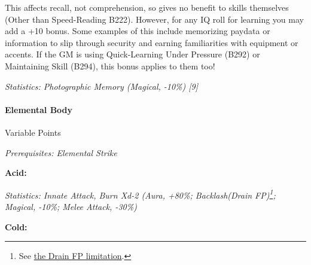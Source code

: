 \begin{multicols*}{3}
	This affects recall, not comprehension, so gives no benefit to skills themselves (Other than Speed-Reading B222). However, for any IQ roll for learning you may add a +10 bonus. Some examples of this include memorizing paydata or information to slip through security and earning familiarities with equipment or accents. If the GM is using Quick-Learning Under Pressure (B292) or Maintaining Skill (B294), this bonus applies to them too!

	\textcolor{OliveGreen}{\textit{Statistics: Photographic Memory (Magical, -10\%) [9] }}
	
	\paragraph{Elemental Body}
	\begin{flushright}
		Variable Points
	\end{flushright}
	\begin{flushright}
		\textit{Prerequisites: Elemental Strike}
	\end{flushright}
	
	
	\begin{center} 
	\begin{adjustwidth}{-3mm}{}
		\end{adjustwidth}
	\end{center}
	
	\textbf{Acid:}
	
	\textcolor{OliveGreen}{\textit{Statistics: Innate Attack, Burn Xd-2 (Aura, +80\%; Backlash(Drain FP)\footnote{See \hyperref[drain_mods]{the Drain FP limitation}.}; Magical, -10\%; Melee Attack, -30\%) }}
	
	\textbf{Cold:}
	

\end{multicols*}
